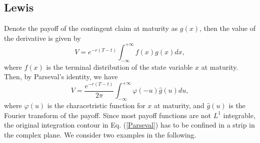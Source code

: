 \documentclass[12pt]{article}
\begin{document}
  \subsection{Lewis \cite{Lewis}}

    Denote the payoff of the contingent claim at maturity as $g(x)$, then the value of the derivative is given by
    \begin{equation}
      V = e^{-r(T-t)}\int_{-\infty}^{+\infty}f(x)g(x)dx,
    \end{equation}
    where $f(x)$ is the terminal distribution of the state variable $x$ at maturity. Then, by Parseval's identity, we have
    \begin{equation}
      V = \frac{e^{-r(T-t)}}{2\pi}\int_{-\infty}^{+\infty}\varphi(-u)\hat{g}(u)du,
      \label{Parseval}
    \end{equation}
    where $\varphi(u)$ is the characetristic function for $x$ at maturity, and $\hat{g}(u)$ is the Fourier transform of
    the payoff. Since most payoff functions are not $L^1$ integrable, the original integration contour in Eq. (\ref{Parseval}) has
    to be confined in a strip in the complex plane. We consider two examples in the following.
\end{document}
